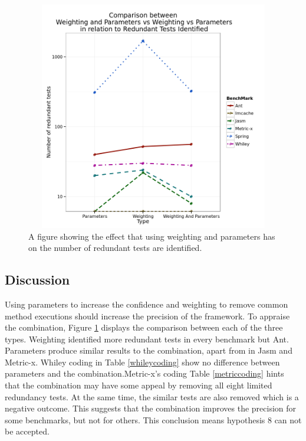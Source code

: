 \begin{figure}[h]
\begin{center}
\includegraphics[height=10cm, width = 14.5cm]{WeightNParamVAll.png}
\end{center}
\caption{A figure showing the effect that using weighting and parameters has on the number of redundant tests are identified.}
\label{fig:weightingparamgraph}
\end{figure}

\subsection{Discussion}
Using parameters to increase the confidence and weighting to remove common method executions should increase the precision of the framework. To appraise the combination, Figure \ref{fig:weightingparamgraph} displays the comparison between each of the three types. Weighting identified more redundant tests in every benchmark but Ant. Parameters produce similar results to the combination, apart from in Jasm and Metric-x. Whiley coding in Table \ref{whileycoding} show no difference between parameters and the combination.Metric-x's coding Table \ref{metriccoding} hints that the combination may have some appeal by removing all eight limited redundancy tests. At the same time, the similar tests are also removed which is a negative outcome. This suggests that the combination improves the precision for some benchmarks, but not for others. This conclusion means hypothesis 8 can not be accepted. 

